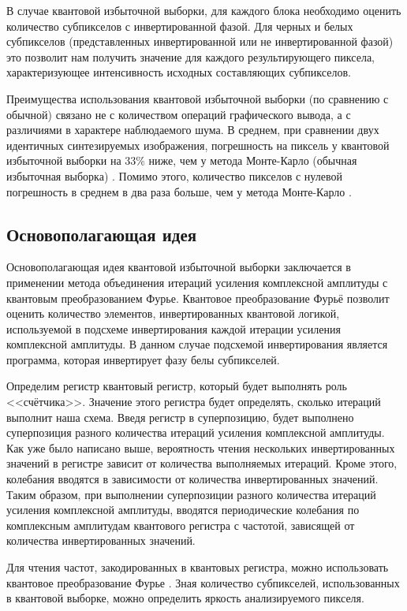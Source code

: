 В случае квантовой избыточной выборки, для каждого блока необходимо оценить количество субпикселов с инвертированной фазой. Для черных и белых субпикселов (представленных инвертированной или не инвертированной фазой) это позволит нам получить значение для каждого результирующего пиксела, характеризующее интенсивность исходных составляющих субпикселов.

Преимущества использования квантовой избыточной выборки (по сравнению с обычной) связано не с количеством операций графического вывода, а с различиями в характере наблюдаемого шума. В среднем, при сравнении двух идентичных синтезируемых изображения, погрешность на пиксель у квантовой избыточной выборки на 33\% ниже, чем у метода Монте-Карло (обычная избыточная выборка) \cite{PQC}. Помимо этого, количество пикселов с нулевой погрешность в среднем в два раза больше, чем у метода Монте-Карло \cite{PQC}.

\subsection{Основополагающая идея}

Основополагающая идея квантовой избыточной выборки заключается в применении метода объединения итераций усиления комплексной амплитуды с квантовым преобразованием Фурье. Квантовое преобразование Фурьё позволит оценить количество элементов, инвертированных квантовой логикой, используемой в подсхеме инвертирования каждой итерации усиления комплексной амплитуды. В данном случае подсхемой инвертирования является программа, которая инвертирует фазу белы субпикселей.

Определим регистр квантовый регистр, который будет выполнять роль <<счётчика>>. Значение этого регистра будет определять, сколько итераций выполнит наша схема. Введя регистр в суперпозицию, будет выполнено суперпозиция разного количества итераций усиления комплексной амплитуды. Как уже было написано выше, вероятность чтения нескольких инвертированных значений в регистре зависит от количества выполняемых итераций. Кроме этого, колебания вводятся в зависимости от количества инвертированных значений. Таким образом, при выполнении суперпозиции разного количества итераций усиления комплексной амплитуды, вводятся периодические колебания по комплексным амплитудам квантового регистра с частотой, зависящей от количества инвертированных значений.

Для чтения частот, закодированных в квантовых регистра, можно использовать квантовое преобразование Фурье \cite{PQC}. Зная количество субпикселей, использованных в квантовой выборке, можно определить яркость анализируемого пикселя.

